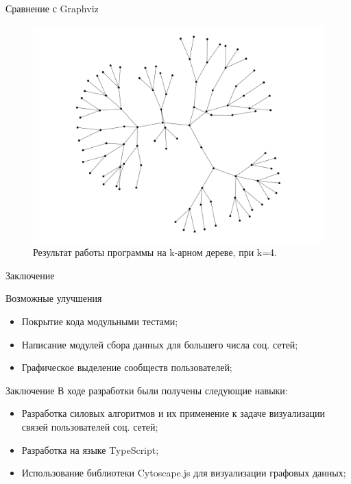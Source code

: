\documentclass{beamer}
\begin{document}
\begin{frame}{Сравнение с Graphviz}
\begin{figure}[H]
\begin{minipage}[t]{.32\textwidth}
			\caption*{алгоритм Камады-Кавай}
		\end{minipage}
		\begin{minipage}[t]{.32\textwidth}
			\centering
			\includegraphics[width=\linewidth]{./imgs/quad_tree_gv.png}
			\caption*{Graphviz}
		\end{minipage}
		\caption{Результат работы программы на k-арном дереве, при k=4.}
	\end{figure}
\end{frame}

\begin{frame}{Заключение}
  \begin{alertblock}{Возможные улучшения}
  \begin{itemize}
    \item Покрытие кода модульными тестами; 
    \item Написание модулей сбора данных для большего числа соц. сетей; 
    \item Графическое выделение сообществ пользователей; 
  \end{itemize}
  \end{alertblock}
\end{frame}

\begin{frame}{Заключение}
  В ходе разработки были получены следующие навыки:
    \begin{itemize}
      \item Разработка силовых алгоритмов и их применение к задаче визуализации связей пользователей соц. сетей;
      \item Разработка на языке TypeScript;
      \item Использование библиотеки Cytoscape.js для визуализации графовых данных;
    \end{itemize}
\end{frame}
\end{document}
